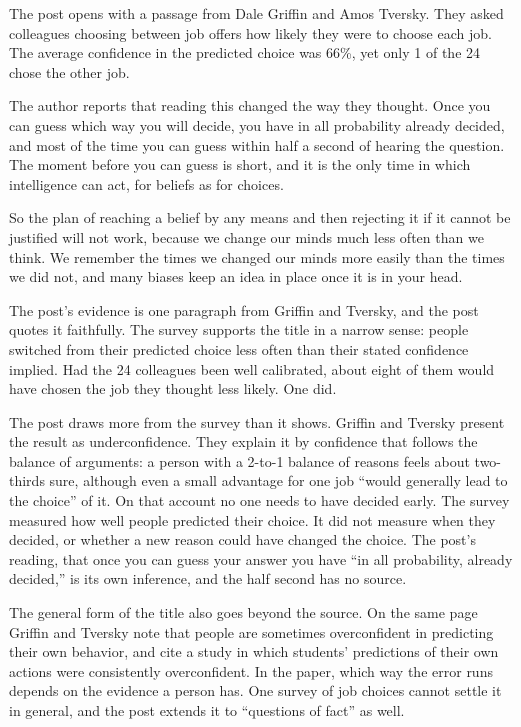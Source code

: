 \begin{afterword}
\summaryhead

The post opens with a passage from Dale Griffin and Amos Tversky. They asked colleagues choosing between job offers how likely they were to choose each job. The average confidence in the predicted choice was 66\%, yet only 1 of the 24 chose the other job.

The author reports that reading this changed the way they thought. Once you can guess which way you will decide, you have in all probability already decided, and most of the time you can guess within half a second of hearing the question. The moment before you can guess is short, and it is the only time in which intelligence can act, for beliefs as for choices.

So the plan of reaching a belief by any means and then rejecting it if it cannot be justified will not work, because we change our minds much less often than we think. We remember the times we changed our minds more easily than the times we did not, and many biases keep an idea in place once it is in your head.

\responsehead

The post's evidence is one paragraph from Griffin and Tversky, and the post quotes it faithfully. The survey supports the title in a narrow sense: people switched from their predicted choice less often than their stated confidence implied. Had the 24 colleagues been well calibrated, about eight of them would have chosen the job they thought less likely. One did.

The post draws more from the survey than it shows. Griffin and Tversky present the result as underconfidence. They explain it by confidence that follows the balance of arguments: a person with a 2-to-1 balance of reasons feels about two-thirds sure, although even a small advantage for one job ``would generally lead to the choice'' of it. On that account no one needs to have decided early. The survey measured how well people predicted their choice. It did not measure when they decided, or whether a new reason could have changed the choice. The post's reading, that once you can guess your answer you have ``in all probability, already decided,'' is its own inference, and the half second has no source.

The general form of the title also goes beyond the source. On the same page Griffin and Tversky note that people are sometimes overconfident in predicting their own behavior, and cite a study in which students' predictions of their own actions were consistently overconfident. In the paper, which way the error runs depends on the evidence a person has. One survey of job choices cannot settle it in general, and the post extends it to ``questions of fact'' as well.


\end{afterword}
